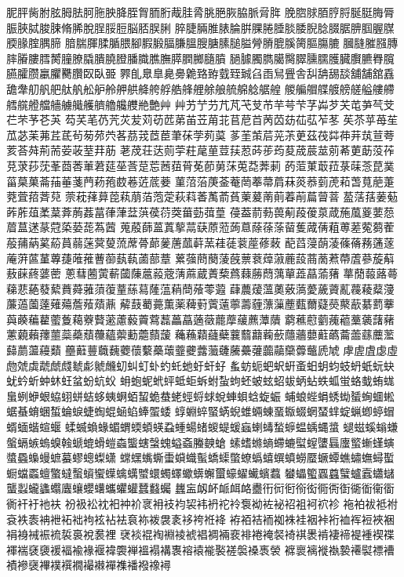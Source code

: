 胒胓胔胕胘胟胠胢胣胦胮胵胷胹胻胾胿脀脁脃脄脇脈脋脌
脕脗脙脜脝脟脠脡脢脣脤脥脦脧脨脩脪脫脭脮脰脳脴脵脷
脺脻脼脽脿腀腁腂腃腄腅腇腉腍腏腒腗腘腛腜腝腞腟腢腣
腤腨腪腬腯腲腳腵腶腷膁膃膄膅膆膇膉膋膌膍膎膐膒膓膔
膕膖膗膙膞膟膡膢膤膥膧膫膬膭膮膯膰膱膲膴膵膶膷膸膹
膼臄臅臇臈臋臎臐臑臒臓臔臕臖臗臙臛臜臝臞臡臢臤臥臦
臩臫臮臯臰臱臲臵臶臷臸臹臽臿舃舋舎舏舑舓舕舖舗舘舙
舚舝舠舤舥舦舧舩舮舲舺舼舽舿艀艁艂艃艅艆艈艊艌艍艎
艐艑艒艓艔艕艖艗艛艜艝艞艠艡艢艣艥艧艩艪艬艭艵艶⾋
艸艻艼芀芁芃芅芆芇芉芌芐芓芔芕芖芚芛芞芠芢芣芧芲芵
芶芺芼芿苀苂苃苅苆苉苐苖苙苚苝苢苨苩苪苬苭苮苰苲苳
苵苶苸苺苼苽苾苿茀茊茋茍茐茒茓茖茘茙茝茞茟茠茡茢茣
茤茥茦茩茪茮茰茲茷茻茽茾茿荁荂荄荅荈荊荋荌荍荎荓荕
荖荗荘荙荝荢荰荱荲荳荴荵荶荹荺荾荿莀莁莂莃莄莇莈莋
莌莍莏莐莑莔莕莗莙莚莝莟莡莣莤莥莦莬莭莮莯莵莻莾莿
菂菃菄菆菈菉菋菍菎菐菑菒菓菕菗菙菚菛菞菢菣菤菦菧菨
菫菬菭菮菳菴菵菶菷菺菻菼菾菿萀萂萅萈萉萐萒萓萔萕萖
萗萙萚萛萞萟萠萡萢萣萩萪萫萭萮萯萰萲萳萴萶萷萹萺萻
萾萿葀葁葂葃葄葅葇葈葊葋葌葍葎葏葐葓葔葕葖葘葝葞葟
葠葢葥葧葨葪葮葰葲葴葹葻葼葽葾葿蒀蒁蒃蒄蒅蒆蒊蒍蒏
蒐蒑蒒蒕蒖蒘蒚蒛蒝蒞蒟蒠蒢蒣蒤蒥蒦蒧蒨蒩蒪蒫蒬蒭蒮
蒰蒱蒳蒵蒶蒷蒻蒾蓂蓃蓅蓆蓇蓈蓌蓎蓏蓒蓔蓕蓗蓘蓙蓚蓛
蓜蓞蓡蓢蓤蓧蓨蓩蓪蓫蓭蓱蓲蓳蓴蓵蓶蓷蓸蓹蓺蓻蓾蔀蔁
蔂蔃蔄蔅蔆蔇蔈蔉蔊蔋蔍蔎蔏蔐蔒蔕蔖蔘蔙蔛蔜蔝蔠蔢蔤
蔥蔧蔨蔩蔪蔮蔯蔰蔱蔲蔳蔴蔵蔶蔾蔿蕀蕂蕄蕅蕇蕋蕌蕍蕏
蕐蕑蕔蕗蕚蕛蕜蕝蕟蕠蕡蕣蕥蕦蕧蕫蕬蕮蕯蕰蕱蕳蕵蕶蕸
蕼蕽蕿薀薁薂薃薆薉薋薍薎薐薒薓薕薖薗薘薙薚薝薞薠薡
薢薣薥薧薫薬薭薱薲薳薴薵薶薸薻薼薽薾薿藀藂藃藄藅藆
藇藈藊藋藌藑藒藔藖藗藘藙藚藛藞藟藠藡藢藣藦藧藨藫藬
藭藮藯藰藱藲藳藵藷藸藼藽藾蘀蘁蘂蘃蘈蘉蘊蘌蘍蘎蘏蘐
蘒蘓蘔蘕蘗蘘蘙蘛蘜蘝蘟蘠蘡蘣蘤蘥蘦蘨蘪蘫蘬蘮蘯蘰蘱
蘲蘳蘴蘵蘶蘷蘹蘻蘽蘾虀虁虂虃虄虅虆虇虈虉虊虋虌虒虓
虖虗虘虙虛虝虠虡虣虤虥虦虨虩虪虭虯虰虲虳虴虵虶虷虸
蚃蚄蚅蚆蚇蚈蚉蚎蚏蚐蚑蚒蚔蚖蚗蚘蚙蚚蚛蚞蚟蚠蚡蚢蚥
蚦蚫蚭蚮蚲蚳蚷蚸蚹蚻蚼蚽蚾蚿蛁蛂蛃蛅蛈蛌蛍蛒蛓蛕蛖
蛗蛚蛜蛝蛠蛡蛢蛣蛥蛦蛧蛨蛪蛫蛬蛯蛵蛶蛷蛻蛼蛽蛿蜁蜄
蜅蜋蜌蜎蜏蜐蜑蜔蜖蜙蜛蜝蜟蜠蜤蜦蜧蜨蜪蜫蜬蜭蜯蜰蜲
蜳蜵蜶蜸蜹蜺蜼蜽蝀蝁蝂蝃蝄蝅蝆蝊蝋蝍蝏蝐蝑蝒蝔蝖蝘
蝚蝛蝜蝝蝞蝟蝡蝢蝧蝨蝩蝪蝫蝬蝭蝯蝱蝲蝳蝵蝷蝹蝺蝿螀
螁螆螇螉螊螌螎螏螐螑螒螔螕螖螘螙螚螛螜螝螠螡螣螤螥
螦螧螩螪螮螰螱螲螴螶螷螸螹螼螾螿蟁蟂蟃蟅蟇蟉蟌蟍蟏
蟐蟔蟕蟖蟗蟘蟙蟚蟜蟝蟞蟟蟡蟢蟤蟦蟧蟨蟩蟫蟭蟰蟱蟳蟴
蟵蟷蟸蟺蟼蟽蟿蠀蠁蠂蠄蠇蠈蠉蠋蠌蠍蠎蠏蠒蠔蠗蠘蠙蠚
蠜蠝蠞蠠蠤蠥蠦蠧蠨蠩蠪蠫蠬蠭蠮蠯蠰蠳蠴蠵蠷蠸蠺蠽蠾
蠿衁衂衃衇衈衉衋衎衏衐衑衒衕衖衘衚衜衞衟衠衦衧衪衭
衯衱衳衴衵衶衸衺衻衼袀袃袆袇袉袊袌袎袏袐袑袓袔袕袗
袘袙袚袛袝袞袟袠袡袣袥袦袧袨袩袪袬袮袯袰袲袳袴袵袶
袸袹袺袻袽袾袿裀裃裄裇裈裋裌裍裐裑裓裖裗裚裛裞裠裡
裦裧裩裪裫裬裭裮裯裲裵裶裷裺裻裿褀褁褃褄褅褆褈褉褋
褌褍褎褏褑褔褕褖褗褘褜褝褞褟褠褢褣褤褦褧褨褩褬褭褮
褯褱褵褷褹褺褼褽褾褿襀襂襃襅襆襈襉襊襋襌襍襎襏襐襑
